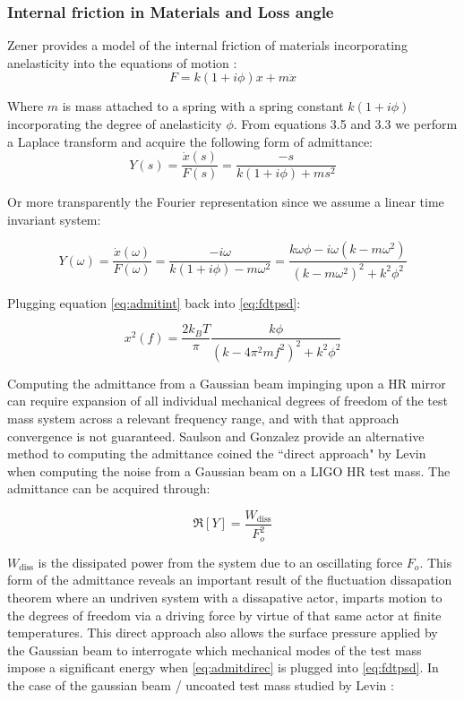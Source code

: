 \subsubsection{Internal friction in Materials and Loss angle}
Zener provides a model of the internal friction of materials incorporating anelasticity into the equations of motion \cite{zener:1948}:
\begin{equation}
F = k(1+i\phi)x + m\ddot{x}
\end{equation}

Where $m$ is mass attached to a spring with a spring constant $k(1+ i\phi)$ incorporating the degree of anelasticity $\phi$. From equations 3.5 and 3.3 we perform a Laplace transform and acquire the following form of admittance:
\begin{equation}
Y(s) = \frac{\dot{x}(s)}{F(s)} = \frac{-s}{k(1+i\phi) + ms^2}
\end{equation}

\noindent Or more transparently the Fourier representation since we assume a linear time invariant system:

\begin{equation}\label{eq:admitint}
Y(\omega) = \frac{\dot{x}(\omega)}{F(\omega)} = \frac{-i\omega}{k(1+i\phi) - m\omega^2} = \frac{k \omega \phi - i \omega (k - m \omega^2)}{(k-m\omega^2)^2 +k^2 \phi^2}
\end{equation}

\noindent Plugging equation \autoref{eq:admitint} back into \autoref{eq:fdtpsd}:

\begin{equation}
x^2 (f)  = \frac{2k_B T}{\pi}\frac{k\phi}{(k-4\pi^2 m f^2)^2 + k^2 \phi^2}
\end{equation}

Computing the admittance from a Gaussian beam impinging upon a HR mirror can require expansion of all individual mechanical degrees of freedom of the test mass system across a relevant frequency range, and with that approach convergence is not guaranteed. Saulson and Gonzalez provide an alternative method to computing the admittance coined the ``direct approach" by Levin when computing the noise from a Gaussian beam on a LIGO HR test mass. The admittance can be acquired through:

\begin{equation}\label{eq:admitdirec}
\Re[Y] = \frac{W_\mathrm{diss}}{F_o^2}
\end{equation}

\noindent $W_\mathrm{diss}$ is the dissipated power from the system due to an oscillating force $F_o$. This form of the admittance reveals an important result of the fluctuation dissapation theorem where an undriven system with a dissapative actor, imparts motion to the degrees of freedom via a driving force by virtue of that same actor at finite temperatures. This direct approach also allows the surface pressure applied by the Gaussian beam to interrogate which mechanical modes of the test mass impose a significant energy when \autoref{eq:admitdirec} is plugged into \autoref{eq:fdtpsd}. In the case of the gaussian beam / uncoated test mass studied by Levin \cite{levin:1998}:

